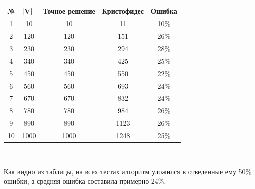 \documentclass[A4, twocolumn]{article}
\begin{document}
\begin{center}
	\begin{tabular}{|c|c|c|c|c|}
		\hline
		\multicolumn{1}{|l|}{№} & \multicolumn{1}{l|}{|V|} & \multicolumn{1}{l|}{Точное решение} & \multicolumn{1}{l|}{Кристофидес} & \multicolumn{1}{l|}{Ошибка} \\ \hline
		1                           & 10                       & 10                                  & 11                                     & 10\%                        \\ \hline
		2                           & 120                      & 120                                 & 151                                    & 26\%                        \\ \hline
		3                           & 230                      & 230                                 & 294                                    & 28\%                        \\ \hline
		4                           & 340                      & 340                                 & 425                                    & 25\%                        \\ \hline
		5                           & 450                      & 450                                 & 550                                    & 22\%                        \\ \hline
		6                           & 560                      & 560                                 & 693                                    & 24\%                        \\ \hline
		7                           & 670                      & 670                                 & 832                                    & 24\%                        \\ \hline
		8                           & 780                      & 780                                 & 984                                    & 26\%                        \\ \hline
		9                           & 890                      & 890                                 & 1123                                   & 26\%                        \\ \hline
		10                          & 1000                     & 1000                                & 1248                                   & 25\%                        \\ \hline
	\end{tabular}
	
	$                 $
	
\end{center}
Как видно из таблицы, на всех тестах алгоритм уложился в отведенные ему 50\% ошибки, а средняя ошибка составила примерно 24\%.
\end{document}
